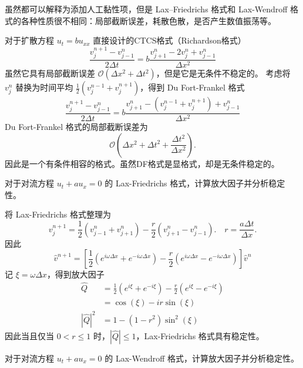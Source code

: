 \begin{remark}
    虽然都可以解释为添加人工黏性项，但是 Lax–Friedrichs 格式和 Lax-Wendroff 格式的各种性质很不相同：局部截断误差，耗散色散，是否产生数值振荡等。
\end{remark}

对于扩散方程 $u_t = b u_{xx}$ 直接设计的CTCS格式（Richardson格式）
\[
    \frac{v_j^{n+1}-v_{j-1}^n}{2\Delta t} = b \frac{v_{j+1}^n - 2 v_j^n + v_{j-1}^n}{\Delta x^2}
\]
虽然它具有局部截断误差 $\mathcal{O}(\Delta x^2+\Delta t^2)$，但是它是无条件不稳定的。
考虑将 $v_j^n$ 替换为时间平均 $\frac12(v_j^{n-1} + v_j^{n+1})$，得到 Du Fort-Frankel 格式
\[
    \frac{v_j^{n+1}-v_{j-1}^n}{2\Delta t} = b \frac{v_{j+1}^n - (v_{j}^{n-1}+v_j^{n+1}) + v_{j-1}^n}{\Delta x^2}
\]
Du Fort-Frankel 格式的局部截断误差为
\[
    \mathcal{O}(\Delta x^2 + \Delta t^2 + \frac{\Delta t^2}{\Delta x^2}).
\]
因此是一个有条件相容的格式。虽然DF格式是显格式，却是无条件稳定的。


\begin{example}
    对于对流方程 $u_t + a u_{x} = 0$ 的 Lax-Friedrichs 格式，计算放大因子并分析稳定性。
\end{example}

\begin{solution*}
    将 Lax-Friedrichs 格式整理为
    \[
        v_{j}^{n+1} = \frac{1}2 (v_{j-1}^n + v_{j+1}^n) - \frac{r}2 (v_{j+1}^n - v_{j-1}^n).
        \quad r = \frac{a \Delta t}{\Delta x}.
    \]
    因此
    \[
        \hat{v}^{n+1} = \left[
            \frac12 (e^{i \omega \Delta x} + e^{- i \omega \Delta x})
            - \frac{r}2 (e^{i \omega \Delta x} - e^{- i \omega \Delta x})
            \right] \hat{v}^n
    \]
    记 $\xi = \omega \Delta x$，得到放大因子
    \begin{align*}
        \widehat{Q}
                        & = \frac12 (e^{i \xi} + e^{- i \xi})
        - \frac{r}2 (e^{i \xi} - e^{- i \xi})
        \\
                        & = \cos(\xi) - i r \sin(\xi)
        \\
        |\widehat{Q}|^2 & =
        1 - (1-r^2) \sin^2(\xi)
    \end{align*}
    因此当且仅当 $0 < r \le 1$ 时，$|\widehat{Q}| \le 1$，Lax-Friedrichs 格式具有稳定性。
\end{solution*}

\begin{example}
    对于对流方程 $u_t + a u_{x} = 0$ 的 Lax-Wendroff 格式，计算放大因子并分析稳定性。
\end{example}

